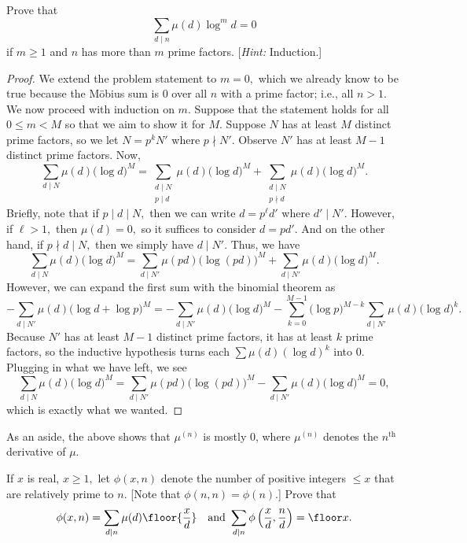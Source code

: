 \begin{exercise}
Prove that
\[\sum_{d\mid n}\mu(d)\log^md=0\]
if $m\ge1$ and $n$ has more than $m$ prime factors. [\textit{Hint:} Induction.]
\end{exercise}

\begin{proof}
We extend the problem statement to $m=0,$ which we already know to be true because the M\"obius sum is 0 over all $n$ with a prime factor; i.e., all $n>1.$ We now proceed with induction on $m.$ Suppose that the statement holds for all $0\le m<M$ so that we aim to show it for $M.$ Suppose $N$ has at least $M$ distinct prime factors, so we let $N=p^kN'$ where $p\nmid N'.$ Observe $N'$ has at least $M-1$ distinct prime factors. Now,
\[\sum_{d\mid N}\mu(d)\big(\log d\big)^M=\sum_{\substack{d\mid N\\p\mid d}}\mu(d)\big(\log d\big)^M+\sum_{\substack{d\mid N\\p\nmid d}}\mu(d)\big(\log d\big)^M.\]
Briefly, note that if $p\mid d\mid N,$ then we can write $d=p^\ell d'$ where $d'\mid N'.$ However, if $\ell>1,$ then $\mu(d)=0,$ so it suffices to consider $d=pd'.$ And on the other hand, if $p\nmid d\mid N,$ then we simply have $d\mid N'.$ Thus, we have
\[\sum_{d\mid N}\mu(d)\big(\log d\big)^M=\sum_{d\mid N'}\mu(pd)\big(\log(pd)\big)^M+\sum_{d\mid N'}\mu(d)\big(\log d\big)^M.\]
However, we can expand the first sum with the binomial theorem as
\[-\sum_{d\mid N'}\mu(d)\big(\log d+\log p\big)^M=-\sum_{d\mid N'}\mu(d)\big(\log d\big)^M-\sum_{k=0}^{M-1}\big(\log p\big)^{M-k}\sum_{d\mid N'}\mu(d)\big(\log d\big)^k.\]
Because $N'$ has at least $M-1$ distinct prime factors, it has at least $k$ prime factors, so the inductive hypothesis turns each $\sum\mu(d)(\log d)^k$ into 0. Plugging in what we have left, we see
\[\sum_{d\mid N}\mu(d)\big(\log d\big)^M=\sum_{d\mid N'}\mu(pd)\big(\log(pd)\big)^M-\sum_{d\mid N'}\mu(d)\big(\log d\big)^M=0,\]
which is exactly what we wanted.
\end{proof}

As an aside, the above shows that $\mu^{(n)}$ is mostly 0, where $\mu^{(n)}$ denotes the $n^\text{th}$ derivative of $\mu.$

\begin{exercise}
If $x$ is real, $x\ge1,$ let $\phi(x,n)$ denote the number of positive integers $\le x$ that are relatively prime to $n.$ [Note that $\phi(n,n)=\phi(n).$] Prove that
\[\phi(x,n)=\sum_{d\mid n}\mu(d)\floor{\frac xd}\quad\text{and }\sum_{d\mid n}\phi\left(\frac xd,\frac nd\right)=\floor x.\]
\end{exercise}

